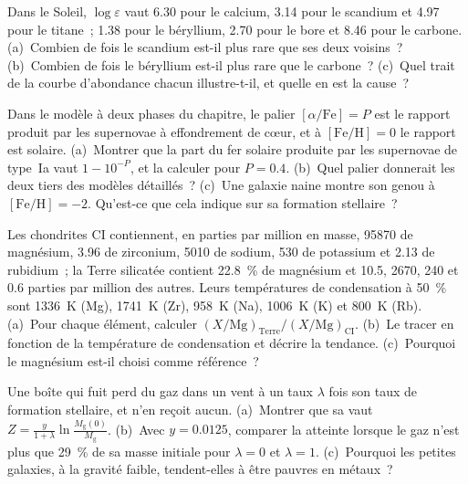 \begin{exercise}[$\star\star$]\label{exo:b3:origin-of-elements:8}
Dans le Soleil, $\log\varepsilon$ vaut \num{6.30} pour le calcium, \num{3.14} pour
le scandium et \num{4.97} pour le titane~; \num{1.38} pour le béryllium,
\num{2.70} pour le bore et \num{8.46} pour le carbone. (a)~Combien de fois le scandium
est-il plus rare que ses deux voisins~? (b)~Combien de fois le béryllium est-il plus rare
que le carbone~? (c)~Quel trait de la courbe d'abondance chacun illustre-t-il, et quelle
en est la cause~?
\end{exercise}

\begin{exercise}[$\star\star$]\label{exo:b3:origin-of-elements:9}
Dans le modèle à deux phases du chapitre, le palier
$[\alpha/\mathrm{Fe}] = P$ est le rapport produit par les supernovae à effondrement de cœur,
et à $[\mathrm{Fe/H}] = 0$ le rapport est solaire. (a)~Montrer que la part du fer
solaire produite par les supernovae de type~Ia vaut $1 - 10^{-P}$, et la calculer pour
$P = 0.4$. (b)~Quel palier donnerait les deux tiers des
modèles détaillés~? (c)~Une galaxie naine montre son genou à
$[\mathrm{Fe/H}] = -2$. Qu'est-ce que cela indique sur sa formation stellaire~?
\end{exercise}

\begin{exercise}[$\star\star\star$]\label{exo:b3:origin-of-elements:10}
Les chondrites CI contiennent, en parties par million en masse, \num{95870}
de magnésium, \num{3.96} de zirconium, \num{5010} de sodium, \num{530}
de potassium et \num{2.13} de rubidium~; la Terre silicatée contient
\qty{22.8}{\percent} de magnésium et \num{10.5}, \num{2670}, \num{240}
et \num{0.6} parties par million des autres. Leurs températures de
condensation à 50~\% sont \qty{1336}{K} (Mg), \qty{1741}{K} (Zr),
\qty{958}{K} (Na), \qty{1006}{K} (K) et \qty{800}{K} (Rb). (a)~Pour
chaque élément, calculer $(X/\mathrm{Mg})_\mathrm{Terre}/(X/\mathrm{Mg})_\mathrm{CI}$.
(b)~Le tracer en fonction de la température de condensation et décrire la
tendance. (c)~Pourquoi le magnésium est-il choisi comme référence~?
\end{exercise}

\begin{exercise}[$\star\star\star$]\label{exo:b3:origin-of-elements:11}
Une boîte qui fuit perd du gaz dans un vent à un taux $\lambda$ fois son taux de
formation stellaire, et n'en reçoit aucun. (a)~Montrer que sa  vaut
$Z = \frac{y}{1 + \lambda}\ln\frac{M_\mathrm{g}(0)}{M_\mathrm{g}}$.
(b)~Avec $y = 0.0125$, comparer la  atteinte lorsque le gaz n'est plus
que \qty{29}{\percent} de sa masse initiale pour $\lambda = 0$ et
$\lambda = 1$. (c)~Pourquoi les petites galaxies, à la gravité faible, tendent-elles à être
pauvres en métaux~?
\end{exercise}

